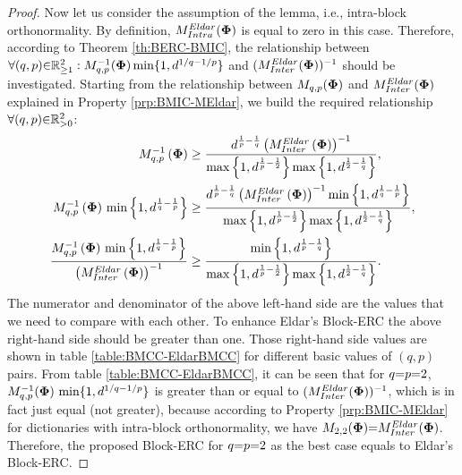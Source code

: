 \begin{proof}
Now let us consider the assumption of the lemma, i.e., intra-block orthonormality.
By definition, $M^{Eldar}_{Intra}(\boldsymbol{\Phi})$ is equal to zero in this case.
Therefore, according to Theorem \ref{th:BERC-BMIC}, the relationship between $\forall (q,p) {\in} \mathbb{R}^2_{{\geq} 1} : M_{q,p}^{-1}(\boldsymbol{\Phi}) \min \{1 , d^{1/q {-} 1/p} \}$ and 
$(M^{Eldar}_{Inter}(\boldsymbol{\Phi}))^{-1}$ should be investigated.
Starting from the relationship between $M_{q,p}(\boldsymbol{\Phi})$ and $M^{Eldar}_{Inter}(\boldsymbol{\Phi})$ explained in Property \ref{prp:BMIC-MEldar}, we build the required relationship $\forall (q,p) {\in} \mathbb{R}^2_{{>} 0}$:
\begin{gather*}
\begin{aligned}
M_{q,p}^{-1}\left( \boldsymbol{\Phi} \right) &\geq 
\frac{d^{\frac1p - \frac1q} \left( M^{Eldar}_{Inter}\left( \boldsymbol{\Phi} \right) \right) ^{-1}}{\max \left\lbrace 1 , d^{\frac1p - \frac{1}{2}} \right\rbrace \max \left\lbrace 1 , d^{\frac{1}{2} - \frac1q} \right\rbrace}, \\
M_{q,p}^{-1}\left( \boldsymbol{\Phi} \right) \, \min \left\lbrace 1 , d^{\frac1q - \frac1p} \right\rbrace  &\geq 
\frac{d^{\frac1p - \frac1q} \left( M^{Eldar}_{Inter}\left( \boldsymbol{\Phi} \right) \right) ^{-1} \min \left\lbrace 1 , d^{\frac1q - \frac1p} \right\rbrace}{\max \left\lbrace 1 , d^{\frac1p - \frac{1}{2}} \right\rbrace \max \left\lbrace 1 , d^{\frac{1}{2} - \frac1q} \right\rbrace}, \\
\frac{M_{q,p}^{-1}\left( \boldsymbol{\Phi} \right) \, \min \left\lbrace 1 , d^{\frac1q - \frac1p} \right\rbrace}{\left( M^{Eldar}_{Inter}\left( \boldsymbol{\Phi} \right) \right) ^{-1}}  &\geq 
\frac{\min \left\lbrace 1 , d^{\frac1p - \frac1q} \right\rbrace}{\max \left\lbrace 1 , d^{\frac1p - \frac{1}{2}} \right\rbrace \max \left\lbrace 1 , d^{\frac{1}{2} - \frac1q} \right\rbrace}.
\end{aligned}
\end{gather*}
The numerator and denominator of the above left-hand side are the values that we need to compare with each other.
To enhance Eldar's Block-ERC the above right-hand side should be greater than one.
Those right-hand side values are shown in table \ref{table:BMCC-EldarBMCC} for different basic values of $(q,p)$ pairs.
From table \ref{table:BMCC-EldarBMCC}, it can be seen that for $q {=} p {=} 2$, $M_{q,p}^{-1}(\boldsymbol{\Phi}) \, \min \{1 , d^{1/q {-} 1/p} \}$ is greater than or equal to $(M^{Eldar}_{Inter}(\boldsymbol{\Phi})) ^{-1}$, which is in fact just equal (not greater), because according to Property \ref{prp:BMIC-MEldar} for dictionaries with intra-block orthonormality, we have $M_{2,2}(\boldsymbol{\Phi}) {=} M^{Eldar}_{Inter}(\boldsymbol{\Phi})$.
Therefore, the proposed Block-ERC for $q {=} p {=} 2$ as the best case equals to Eldar's Block-ERC.

\end{proof}

